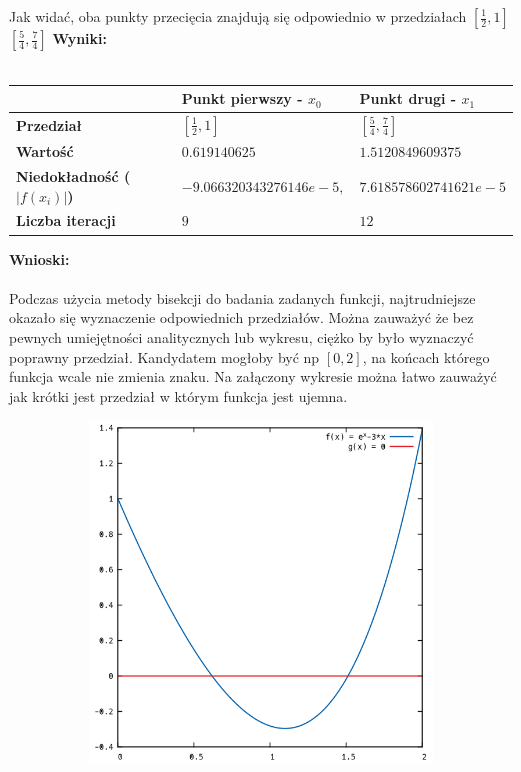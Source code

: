 \documentclass{article}
\begin{document}
Jak widać, oba punkty przecięcia znajdują się odpowiednio w przedziałach $[\frac{1}{2},1]$ $[\frac{5}{4},\frac{7}{4}]$
\newpage
\noindent \textbf{Wyniki: }\\\\
\begin{center}
	\begin{tabular}{|p{5cm}|p{5cm}|p{5cm}|} \hline
		 & \textbf{Punkt pierwszy - $x_0$} & \textbf{Punkt drugi - $x_1$} \\
		\hline
		\textbf{Przedział} & $[\frac{1}{2},1]$ & $[\frac{5}{4},\frac{7}{4}]$ \\
		\hline
		\textbf{Wartość} & $0.619140625$ & $1.5120849609375$ \\
		\hline
		\textbf{Niedokładność ($|f(x_i)|$)} & $-9.066320343276146e-5,$ & $7.618578602741621e-5$ \\
		\hline
		\textbf{Liczba iteracji} & $9$ & $12$ \\
		\hline
	\end{tabular}
\end{center}
\noindent \textbf{Wnioski: }\\\\
Podczas użycia metody bisekcji do badania zadanych funkcji, najtrudniejsze okazało się wyznaczenie odpowiednich przedziałów. Można zauważyć że bez pewnych umiejętności analitycznych lub wykresu, ciężko by było wyznaczyć poprawny przedział. Kandydatem mogłoby być np $[0,2]$, na końcach którego funkcja wcale nie zmienia znaku. Na załączony wykresie można łatwo zauważyć jak krótki jest przedział w którym funkcja jest ujemna.
\begin{figure}[ht]
	\centering
	\begin{subfigure}{.5\textwidth}
		\centering
		\includegraphics[width=1.0\linewidth]{plots/wykres_2.png}  
	\end{subfigure}
\end{figure} \\
\newpage
\end{document}
